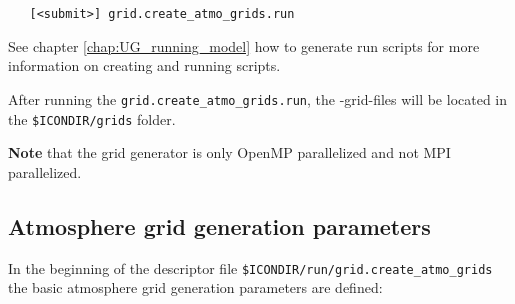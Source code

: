 \begin{small}
  \begin{verbatim}
   [<submit>] grid.create_atmo_grids.run 
  \end{verbatim}
\end{small}

See chapter \ref{chap:UG_running_model} how to generate run scripts for more information on creating and running scripts.

After running the \verb+grid.create_atmo_grids.run+, the \netcdf -grid-files will be located in the \verb+$ICONDIR/grids+ folder.

\textbf{Note} that the grid generator is only OpenMP parallelized and not MPI parallelized.


%
%
%


\subsection{Atmosphere grid generation parameters}

In the beginning of the descriptor file \verb+$ICONDIR/run/grid.create_atmo_grids+ the basic atmosphere grid generation parameters are defined:

